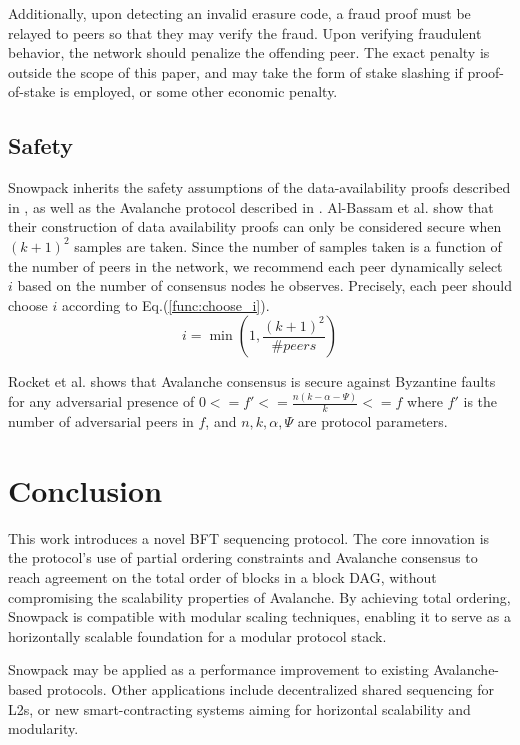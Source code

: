 \documentclass[12pt]{article}
\begin{document}
  Additionally, upon detecting an invalid erasure code, a fraud proof must be
  relayed to peers so that they may verify the fraud. Upon verifying fraudulent
  behavior, the network should penalize the offending peer. The exact penalty
  is outside the scope of this paper, and may take the form of stake slashing
  if proof-of-stake is employed, or some other economic penalty.

\subsection{Safety}
  Snowpack inherits the safety assumptions of the data-availability proofs
  described in \cite{albassam2019fraud}, as well as the Avalanche protocol
  described in \cite{rocket}. Al-Bassam et al. show that their construction of
  data availability proofs can only be considered secure when $(k+1)^2$ samples
  are taken. Since the number of samples taken is a function of the number of
  peers in the network, we recommend each peer dynamically select $i$ based on
  the number of consensus nodes he observes. Precisely, each peer should choose
  $i$ according to Eq.(\ref{func:choose_i}).
  \begin{equation}\label{func:choose_i}
    i = \min(1, \frac{(k+1)^2}{\#peers})
  \end{equation}

  Rocket et al. shows that Avalanche consensus is secure against Byzantine
  faults for any adversarial presence of $ 0 <= f' <=
  \frac{n(k-\alpha-\Psi)}{k} <= f $ where $f'$ is the number of adversarial
  peers in $f$, and $n, k, \alpha, \Psi$ are protocol parameters.

\section{Conclusion}
  This work introduces a novel BFT sequencing protocol. The core innovation is
  the protocol's use of partial ordering constraints and Avalanche consensus to
  reach agreement on the total order of blocks in a block DAG, without
  compromising the scalability properties of Avalanche. By achieving total
  ordering, Snowpack is compatible with modular scaling techniques, enabling it
  to serve as a horizontally scalable foundation for a modular protocol stack.

  Snowpack may be applied as a performance improvement to existing
  Avalanche-based protocols. Other applications include decentralized shared
  sequencing for L2s, or new smart-contracting systems aiming for horizontal
  scalability and modularity.



\end{document}
